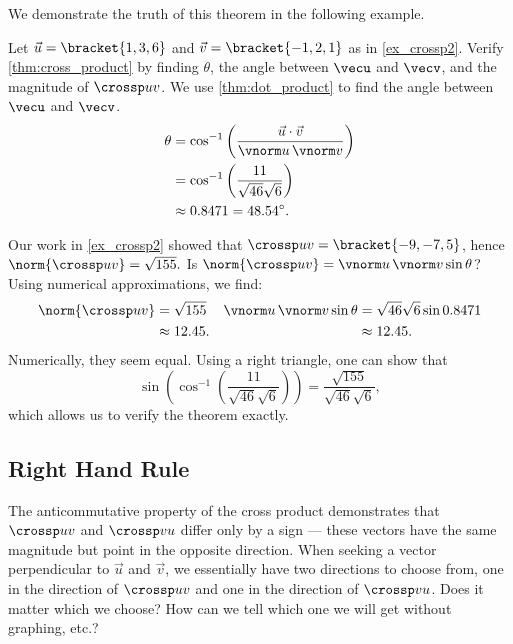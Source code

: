 We demonstrate the truth of this theorem in the following example.

\begin{example}\label{ex_crossp3}
Let $\vec u =\bracket{1,3,6}$ and $\vec v = \bracket{-1,2,1}$ as in \autoref{ex_crossp2}. Verify \autoref{thm:cross_product} by finding $\theta$, the angle between $\vecu$ and $\vecv$, and the magnitude of $\crossp uv$.
\solution
We use \autoref{thm:dot_product} to find the angle between $\vecu$ and $\vecv$. 
\begin{align*}
\theta &= \cos^{-1}\left(\frac{\vec u\cdot\vec v}{\vnorm u\, \vnorm v}\right) \\
			&= \cos^{-1}\left(\frac{11}{\sqrt{46}\sqrt{6}}\right)\\
			&\approx 0.8471 = 48.54^\circ.
\end{align*}

Our work in \autoref{ex_crossp2} showed that $\crossp uv = \bracket{-9,-7,5}$, hence $\norm{\crossp uv} = \sqrt{155}.$ Is $\norm{\crossp uv} = \vnorm u\, \vnorm v\sin\theta$? Using numerical approximations, we find:
\begin{align*}
\norm{\crossp uv}
 &=\sqrt{155}  & \vnorm u\,\vnorm v \sin\theta & = \sqrt{46}\sqrt{6}\sin 0.8471\\
 &\approx 12.45. & &\approx 12.45.
\end{align*}
Numerically, they seem equal. Using a right triangle, one can show that 
\[\sin\left(\cos^{-1}\left(\frac{11}{\sqrt{46}\sqrt{6}}\right)\right) = \frac{\sqrt{155}}{\sqrt{46}\sqrt{6}},\]
which allows us to verify the theorem exactly.
\end{example}

\subsection{Right Hand Rule}

The anticommutative property of the cross product demonstrates that $\crossp uv$ and $\crossp vu$ differ only by a sign --- these vectors have the same magnitude but point in the opposite direction. When seeking a vector perpendicular to $\vec u$ and $\vec v$, we essentially have two directions to choose from, one in the direction of $\crossp uv$ and one in the direction of $\crossp vu$. Does it matter which we choose? How can we tell which one we will get without graphing, etc.?


